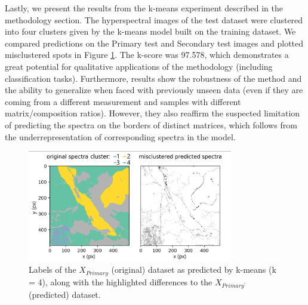 \documentclass[preprint,11pt]{elsarticle}
\begin{document}
Lastly, we present the results from the k-means experiment described in the methodology section. The hyperspectral images of the test dataset were clustered into four clusters given by the k-means model built on the training dataset. We compared predictions on the Primary test and Secondary test images and plotted misclustered spots in Figure \ref{fig:kmeans}. The k-score was 97.578, which demonstrates a great potential for qualitative applications of the methodology (including classification tasks). Furthermore, results show the robustness of the method and the ability to generalize when faced with previously unseen data (even if they are coming from a different measurement and samples with different matrix/composition ratios). However, they also reaffirm the suspected limitation of predicting the spectra on the borders of distinct matrices, which follows from the underrepresentation of corresponding spectra in the model.

\begin{figure}[!htb]
    \centering
    \includegraphics[width=0.8\textwidth]{kmeans_label_comparison.png}
    \caption{Labels of the $X_{Primary}$ (original) dataset as predicted by k-means (k = 4), along with the highlighted differences to the $X_{Primary^{\prime}}$ (predicted) dataset.}
    \label{fig:kmeans}
\end{figure}
\end{document}
